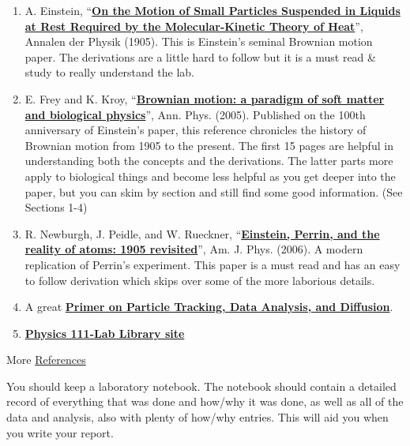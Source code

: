 \documentclass{../lab}
\begin{document}
\begin{enumerate}
    \item A. Einstein, ``\href{http://physics111.lib.berkeley.edu/Physics111/Reprints/BMC/Einstein\_Diffusion1905.pdf}{\textbf{On the Motion of Small Particles Suspended in Liquids at Rest Required by the Molecular-Kinetic Theory of Heat}}'', Annalen der Physik (1905). This is Einstein’s seminal Brownian motion paper. The derivations are a little hard to follow but it is a must read \& study to really understand the lab.

    \item E. Frey and K. Kroy, ``\href{http://physics111.lib.berkeley.edu/Physics111/Reprints/BMC/Brownian\%20Motion\%20-\%20Frey.pdf}{\textbf{Brownian motion: a paradigm of soft matter and biological physics}}'', Ann. Phys. (2005). Published on the 100th anniversary of Einstein’s paper, this reference chronicles the history of Brownian motion from 1905 to the present. The first 15 pages are helpful in understanding both the concepts and the derivations. The latter parts more apply to biological things and become less helpful as you get deeper into the paper, but you can skim by section and still find some good information. (See Sections 1-4)

    \item R. Newburgh, J. Peidle, and W. Rueckner, ``\href{http://physics111.lib.berkeley.edu/Physics111/Reprints/BMC/Newburgh-Einstein-Perrin1905_Revisited.pdf}{\textbf{Einstein, Perrin, and the reality of atoms: 1905 revisited}}'', Am. J. Phys. (2006). A modern replication of Perrin's experiment. This paper is a must read and has an easy to follow derivation which skips over some of the more laborious details.

    \item A great \href{http://www.physics.nyu.edu/grierlab/methods/methods.html}{\textbf{Primer on Particle Tracking, Data Analysis, and Diffusion}}.

    \item \href{\LabReprints}{\textbf{Physics 111-Lab Library site}}
\end{enumerate}

 More \hyperref[sec:References]{References} 

You should keep a laboratory notebook. The notebook should contain a detailed record of everything that was done and how/why it was done, as well as all of the data and analysis, also with plenty of how/why entries. This will aid you when you write your report.
\end{document}
